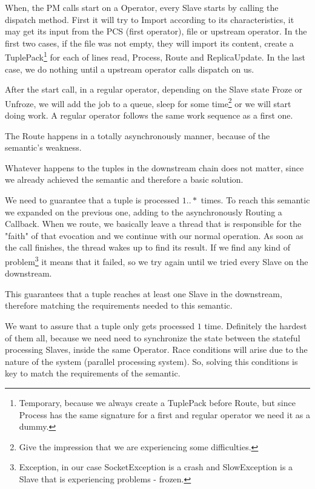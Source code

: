 \documentclass[times, 10pt,twocolumn]{article}
\begin{document}
When, the PM calls start on a Operator, every Slave starts by calling the dispatch method. First it will try to Import according to its characteristics, it may get its input from the PCS (first operator), file or upstream operator. In the first two cases, if the file was not empty, they will import its content, create a TuplePack\footnote
{%
	Temporary, because we always create a TuplePack before Route, but since Process has the same signature for a first and regular operator we need it as a dummy.
} 
for each of lines read, Process, Route and ReplicaUpdate. In the last case, we do nothing until a upstream operator calls dispatch on us.

After the start call, in a regular operator, depending on the Slave state Froze or Unfroze, we will add the job to a queue, sleep for some time\footnote
{%
	Give the impression that we are experiencing some difficulties.
}  
or we will start doing work. A regular operator follows the same work sequence as a first one.

The Route happens in a totally asynchronously manner, because of the semantic's weakness. 

Whatever happens to the tuples in the downstream chain does not matter, since we already achieved the semantic and therefore a basic solution.


We need to guarantee that a tuple is processed $1..*$ times. To reach this semantic we expanded on the previous one, adding to the asynchronously Routing a Callback. When we route, we basically leave a thread that is responsible for the "faith" of that evocation and we continue with our normal operation. As soon as the call finishes, the thread wakes up to find its result. If we find any kind of problem\footnote
{%
	Exception, in our case SocketException is a crash and SlowException is a Slave that is experiencing problems - frozen.
}   
it means that it failed, so we try again until we tried every Slave on the downstream. 

This guarantees that a tuple reaches at least one Slave in the downstream, therefore matching the requirements needed to this semantic.



We want to assure that a tuple only gets processed $1$ time. Definitely the hardest of them all, because we need need to synchronize the state between the stateful processing Slaves, inside the same Operator. Race conditions will arise due to the nature of the system (parallel processing system). So, solving this conditions is key to match the requirements of the semantic. 
\end{document}
